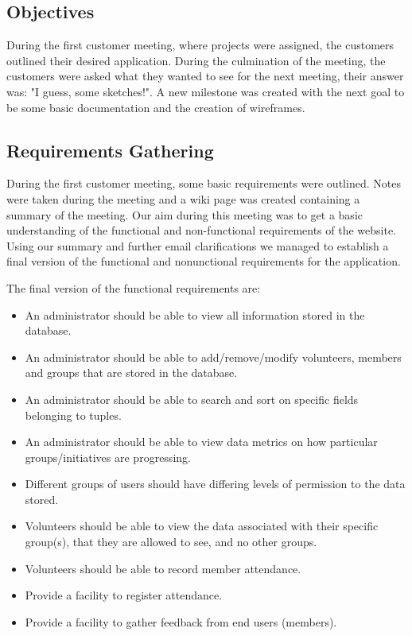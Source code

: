 \documentclass{l3proj}
\begin{document}
\subsection{Objectives}
\label{objectives}

During the first customer meeting, where projects were assigned, the customers outlined their desired application. During the culmination of the meeting, the customers were asked what they wanted to see for the next meeting, their answer was: "I guess, some sketches!". A new milestone was created with the next goal to be some basic documentation and the creation of wireframes.

\subsection{Requirements Gathering}
\label{requirements}

During the first customer meeting, some basic requirements were outlined. Notes were taken during the meeting and a wiki page was created containing a summary of the meeting. Our aim during this meeting was to get a basic understanding of the functional and non-functional requirements of the website. Using our summary and further email clarifications we managed to establish a final version of the functional and nonunctional requirements for the application.

The final version of the functional requirements are:
\begin{itemize}

\item An administrator should be able to view all information stored in the database.

\item An administrator should be able to add/remove/modify volunteers, members and groups that are stored in the database.

\item An administrator should be able to search and sort on specific fields belonging to tuples.

\item An administrator should be able to view data metrics on how particular groups/initiatives are progressing.

\item Different groups of users should have differing levels of permission to the data stored.

\item Volunteers should be able to view the data associated with their specific group(s), that they are allowed to see, and no other groups.

\item Volunteers should be able to record member attendance.

\item Provide a facility to register attendance.

\item Provide a facility to gather feedback from end users (members).

\end{itemize}
\end{document}
